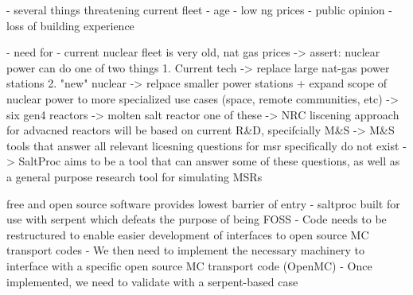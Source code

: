 - several things threatening current fleet
  - age
  - low ng prices
  - public opinion
  - loss of building experience

- need for 
- current nuclear fleet is very old, nat gas prices
 -> assert: nuclear power can do one of two things
    1. Current tech -> replace large nat-gas power stations 
    2. "new" nuclear -> relpace smaller power stations + expand scope
        of nuclear power to more specialized use cases (space, remote communities, etc)
-> six gen4 reactors -> molten salt reactor one of these
-> NRC liscening approach for advacned reactors will be based on current R\&D, specifcially M\&S
-> M\&S tools that answer all relevant licesning questions for msr specifically do not exist
-> SaltProc aims to be a tool that can answer some of these questions, as well as a general purpose
    research tool for simulating MSRs


 free and open source software provides lowest barrier of entry
 - saltproc built for use with serpent which defeats the purpose of being
    FOSS
 - Code needs to be restructured to enable easier development of interfaces to 
 open source MC transport codes
 - We then need to implement the necessary machinery to interface with a specific
    open source MC transport code (OpenMC)
 - Once implemented, we need to validate with a serpent-based case
